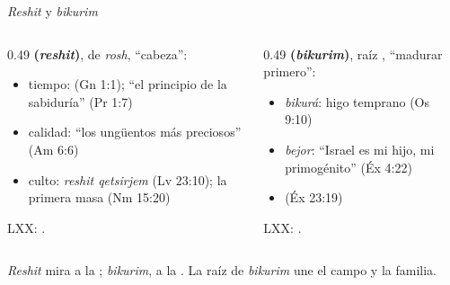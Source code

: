 \begin{frame}{\emph{Reshit} y \emph{bikurim}}
\begin{columns}[t,onlytextwidth]
\begin{column}{0.49\textwidth}\small\RaggedRight
\textbf{\color{tierraroja} (\emph{reshit})}, de \emph{rosh}, ``cabeza'':
\begin{itemize}
\item tiempo:  (Gn 1:1); ``el principio de la sabiduría'' (Pr 1:7)
\item calidad: ``los ungüentos más preciosos'' (Am 6:6)
\item culto: \emph{reshit qetsirjem} (Lv 23:10); la primera masa (Nm 15:20)
\end{itemize}
\scriptsize LXX: .
\end{column}
\begin{column}{0.49\textwidth}\small\RaggedRight
\textbf{\color{tierraroja} (\emph{bikurim})}, raíz , ``madurar primero'':
\begin{itemize}
\item \emph{bikurá}: higo temprano (Os 9:10)
\item \emph{bejor}: ``Israel es mi hijo, mi primogénito'' (Éx 4:22)
\item {} (Éx 23:19)
\end{itemize}
\scriptsize LXX: .
\end{column}
\end{columns}\medskip
\small\RaggedRight \emph{Reshit} mira a la ; \emph{bikurim}, a la . La raíz de \emph{bikurim} une el campo y la familia.
\end{frame}

